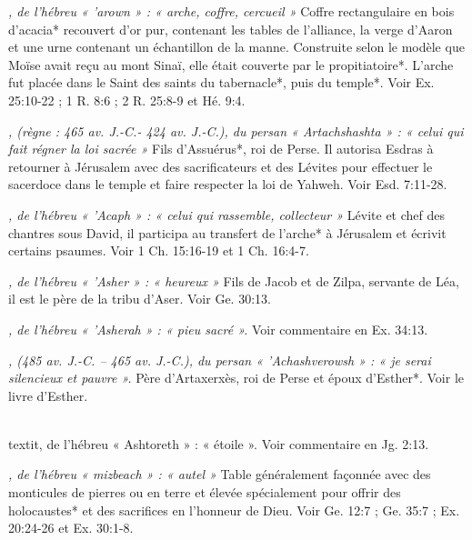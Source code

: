 \begin{multicols}{2}
\textit{, de l'hébreu « 'arown » : « arche, coffre, cercueil »}\newline
Coffre rectangulaire en bois d'acacia* recouvert d'or pur, contenant les tables de l'alliance, la verge d'Aaron et une urne contenant un échantillon de la manne. Construite selon le modèle que Moïse avait reçu au mont Sinaï, elle était couverte par le propitiatoire*. L'arche fut placée dans le Saint des saints du tabernacle*, puis du temple*. Voir Ex. 25:10-22 ; 1 R. 8:6 ; 2 R. 25:8-9 et Hé. 9:4.

\textit{, (règne : 465 av. J.-C.- 424 av. J.-C.), du persan « Artachshashta » : « celui qui fait régner la loi sacrée »}\newline
Fils d'Assuérus*, roi de Perse. Il autorisa Esdras à retourner à Jérusalem avec des sacrificateurs et des Lévites pour effectuer le sacerdoce dans le temple et faire respecter la loi de Yahweh. Voir Esd. 7:11-28.

\textit{, de l'hébreu « 'Acaph » : « celui qui rassemble, collecteur »}\newline
Lévite et chef des chantres sous David, il participa au transfert de l'arche* à Jérusalem et écrivit certains psaumes. Voir 1 Ch. 15:16-19 et 1 Ch. 16:4-7.

\textit{, de l'hébreu « 'Asher » : « heureux »}\newline
Fils de Jacob et de Zilpa, servante de Léa, il est le père de la tribu d'Aser. Voir Ge. 30:13.

\textit{, de l'hébreu « 'Asherah » : « pieu sacré ».}\newline
Voir commentaire en Ex. 34:13.

\textit{, (485 av. J.-C. – 465 av. J.-C.), du persan « 'Achashverowsh » : « je serai silencieux et pauvre ».}\newline
Père d'Artaxerxès, roi de Perse et époux d'Esther*. Voir le livre d'Esther.

\\textit{, de l'hébreu « Ashtoreth » : « étoile ».}\newline
Voir commentaire en Jg. 2:13.

\textit{, de l'hébreu « mizbeach » : « autel »}\newline
Table généralement façonnée avec des monticules de pierres ou en terre et élevée spécialement pour offrir des holocaustes* et des sacrifices en l'honneur de Dieu. Voir Ge. 12:7 ; Ge. 35:7 ; Ex. 20:24-26 et Ex. 30:1-8.


\end{multicols}
